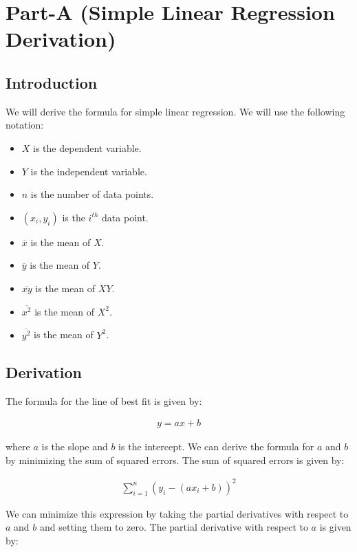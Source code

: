 \section{Part-A (Simple Linear Regression Derivation)}

\subsection{Introduction}

We will derive the formula for simple linear regression. We will use the following notation:

\begin{itemize}
	\item $X$ is the dependent variable.
	\item $Y$ is the independent variable.
	\item $n$ is the number of data points.
	\item $(x_i, y_i)$ is the $i^{th}$ data point.
	\item $\overline{x}$ is the mean of $X$.
	\item $\overline{y}$ is the mean of $Y$.
	\item $\overline{xy}$ is the mean of $XY$.
	\item $\overline{x^2}$ is the mean of $X^2$.
	\item $\overline{y^2}$ is the mean of $Y^2$.
\end{itemize}

\subsection{Derivation}

The formula for the line of best fit is given by:

\begin{align}
	y = ax + b
\end{align}

where $a$ is the slope and $b$ is the intercept. We can derive the formula for $a$ and $b$ by minimizing the sum of squared errors. The sum of squared errors is given by:

\begin{align}
	\sum_{i=1}^{n} (y_i - (ax_i + b))^2
\end{align}

We can minimize this expression by taking the partial derivatives with respect to $a$ and $b$ and setting them to zero. The partial derivative with respect to $a$ is given by:

